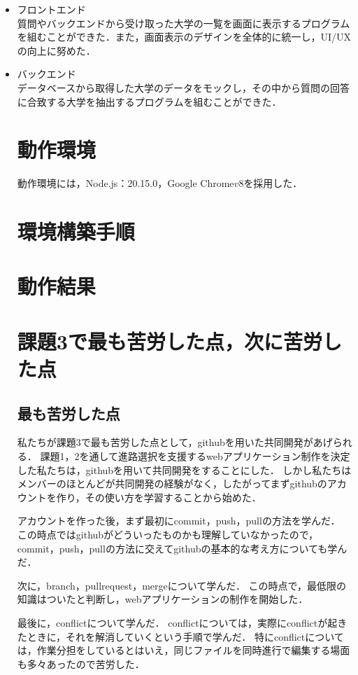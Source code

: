 \documentclass[a4j，titlepage]{jarticle}
\begin{document}
\begin{itemize}
\item{フロントエンド} \\
質問やバックエンドから受け取った大学の一覧を画面に表示するプログラムを組むことができた．また，画面表示のデザインを全体的に統一し，UI/UXの向上に努めた．
\item{バックエンド} \\
データベースから取得した大学のデータをモックし，その中から質問の回答に合致する大学を抽出するプログラムを組むことができた．

\section{動作環境}
動作環境には，Node.js：20.15.0，Google Chrome\(v8\)を採用した．
\section{環境構築手順}

\section{動作結果}

\section{課題3で最も苦労した点，次に苦労した点}
\subsection{最も苦労した点}

私たちが課題3で最も苦労した点として，githubを用いた共同開発があげられる．
課題1，2を通して進路選択を支援するwebアプリケーション制作を決定した私たちは，githubを用いて共同開発をすることにした．
しかし私たちはメンバーのほとんどが共同開発の経験がなく，したがってまずgithubのアカウントを作り，その使い方を学習することから始めた．

アカウントを作った後，まず最初にcommit，push，pullの方法を学んだ．
この時点ではgithubがどういったものかも理解していなかったので，commit，push，pullの方法に交えてgithubの基本的な考え方についても学んだ．

次に，branch，pullrequest，mergeについて学んだ．
この時点で，最低限の知識はついたと判断し，webアプリケーションの制作を開始した．

最後に，conflictについて学んだ．
conflictについては，実際にconflictが起きたときに，それを解消していくという手順で学んだ．
特にconflictについては，作業分担をしているとはいえ，同じファイルを同時進行で編集する場面も多々あったので苦労した．


\end{itemize}
\end{document}
